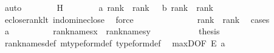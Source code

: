 \begin{isabellebody}
\ auto\isanewline
\ \ \ \ \ \ \isamarkupfalse%
\ H\isanewline
\ \ \ \ \ \ \isamarkupfalse%
\ {\isacharparenleft}{\kern0pt}a{\isacharparenright}{\kern0pt}\ {\isachardoublequoteopen}rank{\isacharparenleft}{\kern0pt}{\isacharquery}{\kern0pt}{\isasymsigma}{\isacharparenright}{\kern0pt}\ {\isacharless}{\kern0pt}\ rank{\isacharparenleft}{\kern0pt}{\isacharquery}{\kern0pt}{\isasymsigma}{\isacharprime}{\kern0pt}{\isacharparenright}{\kern0pt}{\isachardoublequoteclose}\ {\isacharbar}{\kern0pt}\ \ {\isacharparenleft}{\kern0pt}b{\isacharparenright}{\kern0pt}\ {\isachardoublequoteopen}rank{\isacharparenleft}{\kern0pt}{\isacharquery}{\kern0pt}{\isasymsigma}{\isacharparenright}{\kern0pt}\ {\isacharless}{\kern0pt}\ rank{\isacharparenleft}{\kern0pt}{\isacharquery}{\kern0pt}{\isasymtau}{\isacharprime}{\kern0pt}{\isacharparenright}{\kern0pt}{\isachardoublequoteclose}\isanewline
\ \ \ \ \ \ \ \ \isamarkupfalse%
\ eclose{\isacharunderscore}{\kern0pt}rank{\isacharunderscore}{\kern0pt}lt\ in{\isacharunderscore}{\kern0pt}dom{\isacharunderscore}{\kern0pt}in{\isacharunderscore}{\kern0pt}eclose\ \isamarkupfalse%
\ force\isanewline
\ \ \ \ \ \ \isamarkupfalse%
\isanewline
\ \ \ \ \ \ \isamarkupfalse%
\ {\isachardoublequoteopen}rank{\isacharparenleft}{\kern0pt}{\isacharquery}{\kern0pt}{\isasymsigma}{\isacharparenright}{\kern0pt}\ {\isacharless}{\kern0pt}\ rank{\isacharparenleft}{\kern0pt}{\isacharquery}{\kern0pt}{\isasymtau}{\isacharparenright}{\kern0pt}{\isachardoublequoteclose}\ \isamarkupfalse%
\ {\isacharparenleft}{\kern0pt}cases{\isacharparenright}{\kern0pt}\isanewline
\ \ \ \ \ \ \ \ \isamarkupfalse%
\ a\isanewline
\ \ \ \ \ \ \ \ \isamarkupfalse%
\ {\isacartoucheopen}rank{\isacharunderscore}{\kern0pt}names{\isacharparenleft}{\kern0pt}x{\isacharparenright}{\kern0pt}\ {\isacharequal}{\kern0pt}\ rank{\isacharunderscore}{\kern0pt}names{\isacharparenleft}{\kern0pt}y{\isacharparenright}{\kern0pt}\ {\isacartoucheclose}\isanewline
\ \ \ \ \ \ \ \ \isamarkupfalse%
\ {\isacharquery}{\kern0pt}thesis\ \isamarkupfalse%
\ rank{\isacharunderscore}{\kern0pt}names{\isacharunderscore}{\kern0pt}def\ mtype{\isacharunderscore}{\kern0pt}form{\isacharunderscore}{\kern0pt}def\ type{\isacharunderscore}{\kern0pt}form{\isacharunderscore}{\kern0pt}def\ \isamarkupfalse%
\ max{\isacharunderscore}{\kern0pt}D{}{\isacharbrackleft}{\kern0pt}OF\ E\ a{\isacharbrackright}{\kern0pt}\isanewline

\end{isabellebody}
